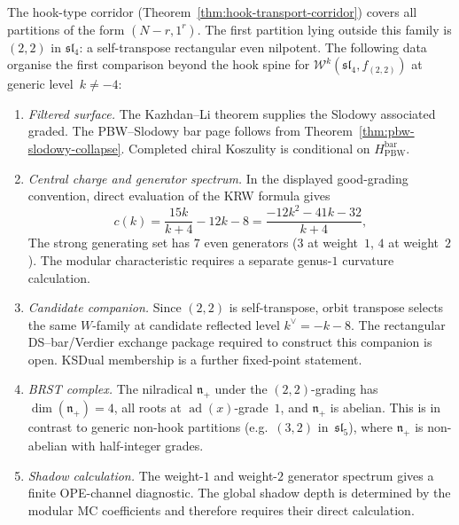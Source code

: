 \begin{remark}
\label{rem:beyond-hook-rectangular}
The hook-type corridor
(Theorem~\ref{thm:hook-transport-corridor}) covers all
partitions of the form $(N{-}r, 1^r)$.
The first partition lying outside this family is $(2,2)$ in
$\mathfrak{sl}_4$: a self-transpose rectangular even nilpotent.
The following data organise the first comparison beyond the hook spine for
$\mathcal{W}^k(\mathfrak{sl}_4, f_{(2,2)})$
at generic level~$k \neq -4$:

\begin{enumerate}[label=\textup{(\roman*)},nosep]
\item \emph{Filtered surface.}
 The Kazhdan--Li theorem supplies the Slodowy associated graded.  The
 PBW--Slodowy bar page follows from
 Theorem~\ref{thm:pbw-slodowy-collapse}.  Completed chiral Koszulity is
 conditional on $H_{\mathrm{PBW}}^{\mathrm{bar}}$.

\item \emph{Central charge and generator spectrum.}
 In the displayed good-grading convention, direct evaluation of the KRW
 formula gives
 \[
 c(k)=\frac{15k}{k+4}-12k-8
 =\frac{-12k^2-41k-32}{k+4},
 \]
 The strong generating set has $7$ even generators
 ($3$ at weight~$1$, $4$ at weight~$2$).  The modular characteristic requires a separate genus-$1$
 curvature calculation.

\item \emph{Candidate companion.}
 Since $(2,2)$ is self-transpose, orbit transpose selects the same
 $W$-family at candidate reflected level $k^\vee=-k-8$.  The
 rectangular DS--bar/Verdier exchange package required to construct this
 companion is open.  KSDual membership is a further fixed-point statement.

\item \emph{BRST complex.}
 The nilradical $\mathfrak{n}_+$ under the $(2,2)$-grading
 has $\dim(\mathfrak{n}_+) = 4$, all roots at
 $\operatorname{ad}(x)$-grade~$1$, and
 $\mathfrak{n}_+$ is abelian. This is in contrast to generic
 non-hook partitions (e.g.\ $(3,2)$ in~$\mathfrak{sl}_5$),
 where $\mathfrak{n}_+$ is non-abelian with half-integer
 grades.

\item \emph{Shadow calculation.}
 The weight-$1$ and weight-$2$ generator spectrum gives a finite OPE-channel
 diagnostic.  The global shadow depth is determined by the modular MC
 coefficients and therefore requires their direct calculation.
\end{enumerate}


\end{remark}
